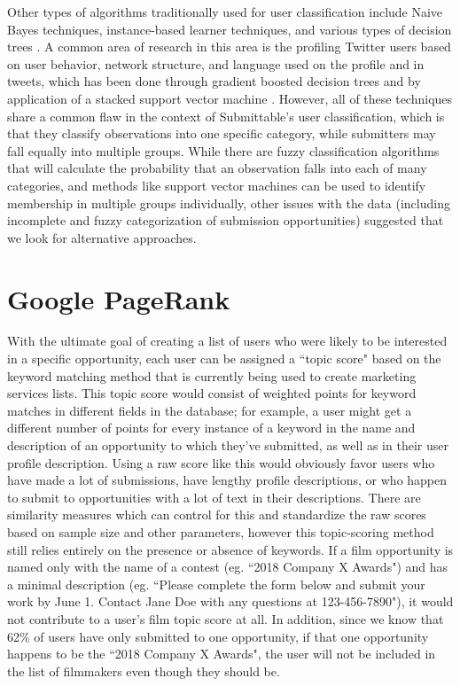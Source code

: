 \documentclass[]{report}   %
\begin{document}
Other types of algorithms traditionally used for user classification include Naive Bayes techniques, instance-based learner techniques,  and various types of decision trees \cite{cufoglu_lohi_madani_2009}. A common area of research in this area is the profiling Twitter users based on user behavior, network structure, and language used on the profile and in tweets, which has been done through gradient boosted decision trees \cite{pennacchiotti_popescu_2011} and by application of a stacked support vector machine \cite{rao_yarowsky_shreevats_gupta_2010}. However, all of these techniques share a common flaw in the context of Submittable's user classification, which is that they classify observations into one specific category, while submitters may fall equally into multiple groups. While there are fuzzy classification algorithms that will calculate the probability that an observation falls into each of many categories, and methods like support vector machines can be used to identify membership in multiple groups individually, other issues with the data (including incomplete and fuzzy categorization of submission opportunities) suggested that we look for alternative approaches.

\section{Google PageRank}

With the ultimate goal of creating a list of users who were likely to be interested in a specific opportunity, each user can be assigned a ``topic score" based on the keyword matching method that is currently being used to create marketing services lists. This topic score would consist of weighted points for keyword matches in different fields in the database; for example, a user might get a different number of points for every instance of a keyword in the name and description of an opportunity to which they've submitted, as well as in their user profile description. Using a raw score like this would obviously favor users who have made a lot of submissions, have lengthy profile descriptions, or who happen to submit to opportunities with a lot of text in their descriptions. There are similarity measures which can control for this and standardize the raw scores based on sample size and other parameters, however this topic-scoring method still relies entirely on the presence or absence of keywords. If a film opportunity is named only with the name of a contest (eg. ``2018 Company X Awards") and has a minimal description (eg. ``Please complete the form below and submit your work by June 1. Contact Jane Doe with any questions at 123-456-7890"), it would not contribute to a user's film topic score at all. In addition, since we know that 62\% of users have only submitted to one opportunity, if that one opportunity happens to be the ``2018 Company X Awards", the user will not be included in the list of filmmakers even though they should be.
\end{document}
